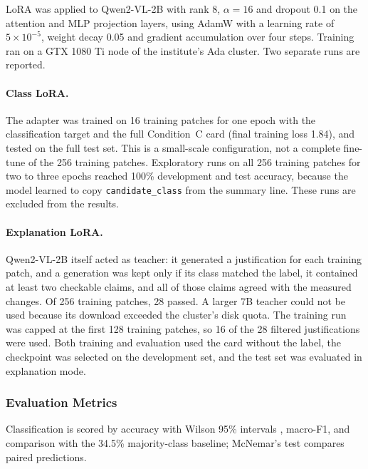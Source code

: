 \documentclass[11pt]{article}
\begin{document}
LoRA \citep{hu2022lora} was applied to Qwen2-VL-2B with rank 8,
$\alpha = 16$ and dropout 0.1 on the attention and MLP projection
layers, using AdamW \citep{loshchilov2019} with a learning rate of
$5 \times 10^{-5}$, weight decay 0.05 and gradient accumulation over
four steps. Training ran on a GTX 1080 Ti node of the institute's Ada
cluster. Two separate runs are reported.

\paragraph{Class LoRA.} The adapter was trained on 16 training patches
for one epoch with the classification target and the full Condition~C
card (final training loss 1.84), and tested on the full test set. This
is a small-scale configuration, not a complete fine-tune of the 256
training patches. Exploratory runs on all 256 training patches for two
to three epochs reached 100\% development and test accuracy, because
the model learned to copy \texttt{candidate\_class} from the summary
line. These runs are excluded from the results.

\paragraph{Explanation LoRA.} Qwen2-VL-2B itself acted as teacher: it
generated a justification for each training patch, and a generation was
kept only if its class matched the label, it contained at least two
checkable claims, and all of those claims agreed with the measured
changes. Of 256 training patches, 28 passed. A larger 7B teacher could
not be used because its download exceeded the cluster's disk quota. The
training run was capped at the first 128 training patches, so 16 of the
28 filtered justifications were used. Both training and evaluation used
the card without the label, the checkpoint was selected on the
development set, and the test set was evaluated in explanation mode.

\subsubsection{Evaluation Metrics}

Classification is scored by accuracy with Wilson 95\% intervals
\citep{wilson1927}, macro-F1, and comparison with the 34.5\%
majority-class baseline; McNemar's test \citep{mcnemar1947} compares
paired predictions.
\end{document}
